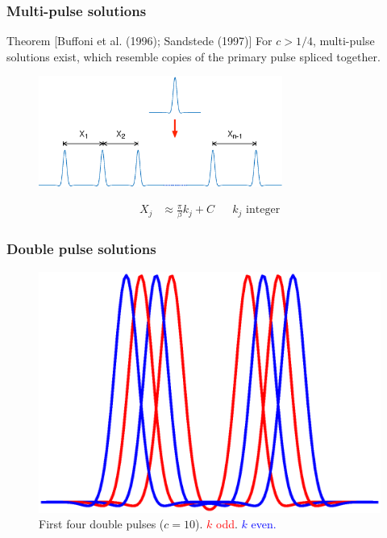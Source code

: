 \documentclass[16pt]{beamer}
\begin{document}
\begin{frame}
\frametitle{Multi-pulse solutions} 
	\fontsize{16}{7.2}\selectfont
    \begin{block}{Theorem [Buffoni et al. (1996); Sandstede (1997)]}
    For $c > 1/4$, multi-pulse solutions exist, which resemble copies of the primary pulse spliced together.

	\begin{figure}
	\begin{center}
	\includegraphics[width=8cm]{images/multipulse.eps}
	\end{center}
	\begin{align*}
	 X_j &\approx \frac{\pi}{\beta} k_j + C && k_j \text{ integer}
	\end{align*}
	\end{figure}

    \end{block}
\end{frame}

\begin{frame}
	\frametitle{Double pulse solutions}
	\fontsize{16}{7.2}\selectfont
	\begin{figure}
	\begin{center}
	\includegraphics[width=0.7\linewidth]{images/first4dp}
	\end{center}
	\caption{First four double pulses ($c = 10$). \textcolor{red}{$k$ odd}. \textcolor{blue}{$k$ even. } }
	\end{figure}
\end{frame}
\end{document}

